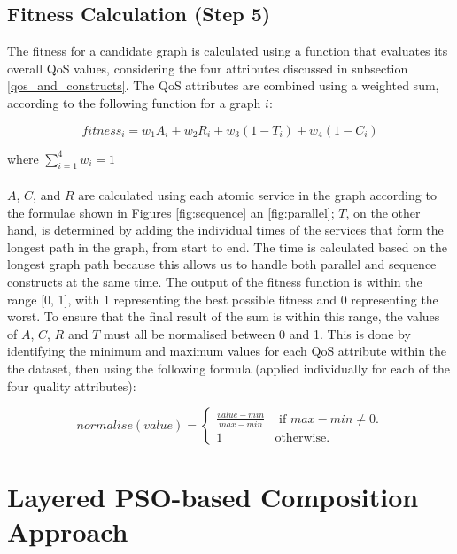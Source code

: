 \documentclass{llncs}
\begin{document}
\subsection{Fitness Calculation (Step 5)}

The fitness for a candidate graph is calculated using a function that evaluates its overall QoS values, considering the four attributes discussed in subsection \ref{qos_and_constructs}. The QoS attributes are combined using a weighted sum, according to the following function for a graph $i$:

\begin{equation}
fitness_i = w_1A_i + w_2R_i + w_3(1 - T_i) + w_4(1 - C_i)
\end{equation}

\noindent where $\sum_{i=1}^{4} w_i = 1$
\\\\
$A$, $C$, and $R$ are calculated using each atomic service in the graph according to the formulae shown in Figures \ref{fig:sequence} an \ref{fig:parallel}; $T$, on the other hand, is determined by adding the individual times of the services that form the longest path in the graph, from start to end. The time is calculated based on the longest graph path because this allows us to handle both parallel and sequence constructs at the same time. The output of the fitness function is within the range [0, 1], with 1 representing the best possible fitness and 0 representing the worst. To ensure that the final result of the sum is within this range, the values of $A$, $C$, $R$ and $T$ must all be normalised between 0 and 1. This is done by identifying the minimum and maximum values for each QoS attribute within the the dataset, then using the following formula (applied individually for each of the four quality attributes):

\begin{equation}
normalise(value) = 
\begin{cases}
	\frac{value - min}{max - min} & \text{ if }max - min \neq 0.\\
	1 & \mathrm{ otherwise}.
\end{cases}
\end{equation}

\section{Layered PSO-based Composition Approach}
\end{document}
